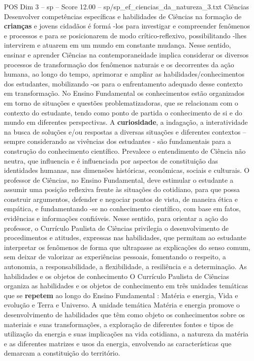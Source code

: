 \begin{textsample}{POS Dim 3 – sp – Score 12.00 – sp/sp\_ef\_ciencias\_da\_natureza\_3.txt}  \label{ex:f3_pos_210}
Ciências Desenvolver competências específicas e habilidades de Ciências na formação de \textbf{crianças} e jovens cidadãos é formá -los para investigar e compreender fenômenos e processos e para se posicionarem de modo crítico-reflexivo, possibilitando -lhes intervirem e atuarem em um mundo em constante mudança.
Nesse sentido, ensinar e aprender Ciências na contemporaneidade implica considerar os diversos processos de transformação dos fenômenos naturais e os decorrentes da ação humana, ao longo do tempo, aprimorar e ampliar as habilidades/conhecimentos dos estudantes, mobilizando -os para o enfrentamento adequado desse contexto em transformação.
No Ensino Fundamental os conhecimentos estão organizados em torno de situações e questões problematizadoras, que se relacionam com o contexto do estudante, tendo como ponto de partida o conhecimento de si e do mundo em diferentes perspectivas.
A \textbf{curiosidade}, a indagação, a interatividade na busca de soluções e/ou respostas a diversas situações e diferentes contextos – sempre considerando as vivências dos estudantes - são fundamentais para a construção do conhecimento científico.
Prevalece o entendimento de Ciência não neutra, que influencia e é influenciada por aspectos de constituição das identidades humanas, nas dimensões históricas, econômicas, sociais e culturais.
O professor de Ciências, no Ensino Fundamental, deve estimular o estudante a assumir uma posição reflexiva frente às situações do cotidiano, para que possa construir argumentos, defender e negociar pontos de vista, de maneira ética e empática, e fundamentando -se no conhecimento científico, com base em fatos, evidências e informações confiáveis.
Nesse sentido, para orientar a ação do professor, o Currículo Paulista de Ciências privilegia o desenvolvimento de procedimentos e atitudes, expressas nas habilidades, que permitam ao estudante interpretar os fenômenos de forma que ultrapasse as explicações do senso comum, sem deixar de valorizar as experiências pessoais, fomentando o respeito, a autonomia, a responsabilidade, a flexibilidade, a resiliência e a determinação.
As habilidades e os objetos de conhecimento O Currículo Paulista de Ciências organiza as habilidades e os objetos de conhecimento em três unidades temáticas que se \textbf{repetem} ao longo do Ensino Fundamental : Matéria e energia, Vida e evolução e Terra e Universo.
A unidade temática Matéria e energia promove o desenvolvimento de habilidades que têm como objeto os conhecimentos sobre os materiais e suas transformações, a exploração de diferentes fontes e tipos de utilização da energia e suas implicações na vida cotidiana, a natureza da matéria e as diferentes matrizes e usos da energia, envolvendo as características que demarcam a constituição do território.

\end{textsample}
